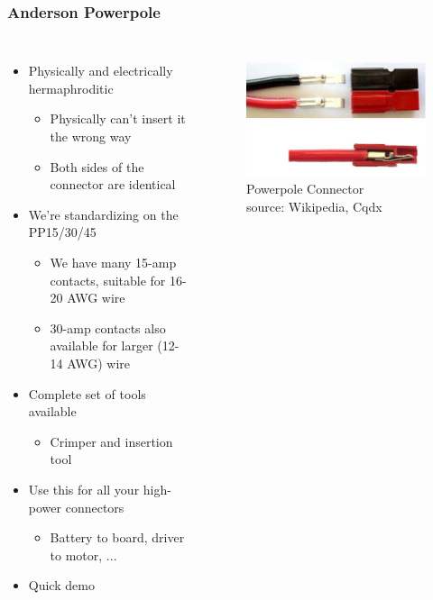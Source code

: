 \documentclass{beamer}
\begin{document}
\begin{frame}
\frametitle{Anderson Powerpole}
\begin{columns}[t]
\begin{itemize}
  \item Physically and electrically hermaphroditic
  \begin{itemize}
    \item Physically can't insert it the wrong way
    \item Both sides of the connector are identical
  \end{itemize}
  \item We're standardizing on the PP15/30/45
  \begin{itemize}
    \item We have many 15-amp contacts, suitable for 16-20 AWG wire
    \item 30-amp contacts also available for larger (12-14 AWG) wire
  \end{itemize}
  \item Complete set of tools available
  \begin{itemize}
    \item Crimper and insertion tool
  \end{itemize}
  \item Use this for all your high-power connectors
  \begin{itemize}
    \item Battery to board, driver to motor, ...
  \end{itemize}
  \item Quick demo
\end{itemize}

\begin{figure}
  \centering
  \includegraphics[width=1.0\columnwidth]{images-dis3/powerpole_cutaway} \\
  Powerpole Connector \\
  {\tiny source: Wikipedia, Cqdx}
\end{figure}
\end{columns}
\end{frame}
\end{document}
